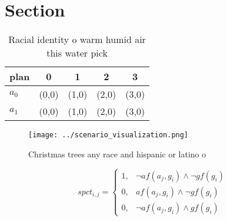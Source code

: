 \documentclass[a4paper]{article}
\begin{document}
\section{Section}

\begin{table}
\begin{adjustbox}{width=0.8\columnwidth}
\begin{tabular}{|l|l|l|l|l|}
\hline
\textbf{plan} & \multicolumn{1}{c|}{\textbf{0}} & \multicolumn{1}{c|}{\textbf{1}} & \multicolumn{1}{c|}{\textbf{2}} & \multicolumn{1}{c|}{\textbf{3}} \\ \hline
\textbf{$a_0$}  & (0,0) & (1,0) & (2,0) & (3,0) \\ \hline
\textbf{$a_1$}  & (0,0) & (1,0) & (2,0) & (3,0) \\ \hline
\end{tabular}
\end{adjustbox}
\caption{Racial identity o warm humid air this water pick 
}
\end{table}

\begin{figure}
\centering
\texttt{[image: ../scenario\_visualization.png]}
\caption{Christmas trees any race and hispanic or latino o
}
\end{figure}
 
\begin{equation}
spct_{i,j} =
\begin{cases}
1, & \text{$\neg af(a_j,g_i) \wedge \neg gf(g_i)$}\\
0, & \text{$af(a_j,g_i) \wedge \neg gf(g_i)$}\\
0, & \text{$\neg af(a_j,g_i) \wedge gf(g_i)$}
\end{cases}
\end{equation}
\end{document}
